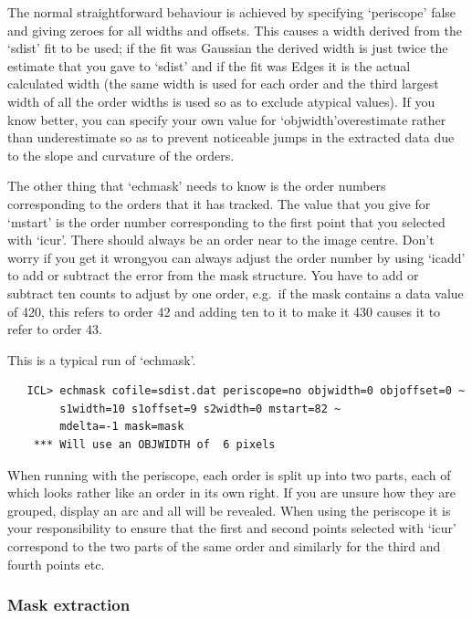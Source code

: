    The normal straightforward behaviour is achieved by specifying
   `periscope' false and giving zeroes for all widths and offsets. This
   causes a width derived from the `sdist' fit to be used; if the fit
   was Gaussian the derived width is just twice the estimate that you
   gave to `sdist' and if the fit was Edges it is the actual calculated
   width (the same width is used for each order and the third largest
   width of all the order widths is used so as to exclude atypical
   values). If you know better, you can specify your own value for
   `objwidth'\latorhtm{---}{-}overestimate rather than underestimate so as
   to prevent
   noticeable jumps in the extracted data due to the slope and curvature
   of the orders.

   The other thing that `echmask' needs to know is the order numbers
   corresponding to the orders that it has tracked. The value that you
   give for `mstart' is the order number corresponding to the first
   point that you selected with `icur'. There should always be an order
   near to the image centre. Don't worry if you get it
   wrong\latorhtm{---}{-}you can
   always adjust the order number by using `icadd' to add or subtract
   the error from the mask structure. You have to add or subtract ten
   counts to adjust by one order, e.g.\ if the mask contains a data value
   of 420, this refers to order 42 and adding ten to it to make it 430
   causes it to refer to order 43.

   This is a typical run of `echmask'.

\begin{verbatim}
   ICL> echmask cofile=sdist.dat periscope=no objwidth=0 objoffset=0 ~
        s1width=10 s1offset=9 s2width=0 mstart=82 ~
        mdelta=-1 mask=mask
    *** Will use an OBJWIDTH of  6 pixels
\end{verbatim}

   When running with the periscope, each order is split up into two
   parts, each of which looks rather like an order in its own right. If
   you are unsure how they are grouped, display an arc and all will be
   revealed. When using the periscope it is your responsibility to
   ensure that the first and second points selected with `icur'
   correspond to the two parts of the same order and similarly for the
   third and fourth points etc.


\subsubsection{Mask extraction}

